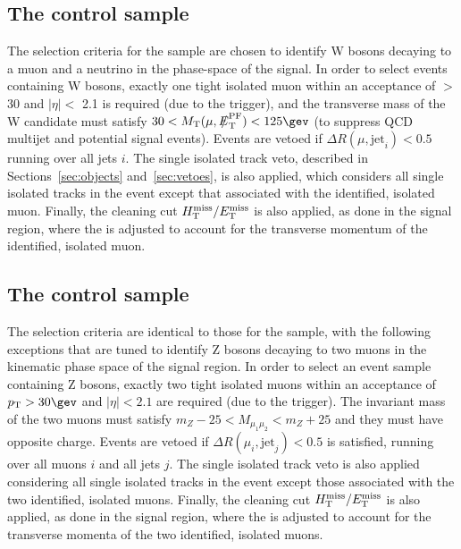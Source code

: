 \subsection{The \texorpdfstring{\mj}{muon plus jets} control sample}
\label{subsec:mucontrolSelection}

The selection criteria for the \mj sample are chosen to identify W
bosons decaying to a muon and a neutrino in the phase-space of the
signal. In order to select events containing W bosons, exactly one
tight isolated muon within an acceptance of \PT $>$ 30 \gev and
$|\eta| <$ 2.1 is required (due to the trigger), and the transverse
mass of the W candidate must satisfy $30 < \mt(\mu,\pfmet) < 125\gev$
(to suppress QCD multijet and potential signal events). Events are
vetoed if $\Delta R(\mu,\textrm{jet}_i) < 0.5$ running over all jets
$i$. The single isolated track veto, described in
Sections~\ref{sec:objects} and~\ref{sec:vetoes}, is also applied,
which considers all single isolated tracks in the event except that
associated with the identified, isolated muon. Finally, the cleaning
cut $\mbox{$H_{\rm T}^{\rm miss}$}/\mbox{$E_\text{T}^{\rm miss}$}$ is also applied, as done in the signal region, where
the \met is adjusted to account for the transverse momentum of the
identified, isolated muon.

\subsection{The \texorpdfstring{\mmj}{di-muon plus jets} control sample}
\label{subsec:mumucontrolSelection}

The selection criteria are identical to those for the \mj sample, with
the following exceptions that are tuned to identify Z bosons decaying
to two muons in the kinematic phase space of the signal region. 
In order to select an event sample containing Z bosons, exactly two
tight isolated muons within an acceptance of $\Pt > 30\gev$ and
$|\eta| < 2.1$ are required (due to the trigger). The invariant mass
of the two muons must satisfy $m_{Z} - 25 < M_{\mu_1\mu_2} < m_{Z} +
25$ and they must have opposite charge. Events are vetoed if $\Delta
R(\mu_{i},\textrm{jet}_j) < 0.5$ is satisfied, running over all muons
$i$ and all jets $j$. The single isolated track veto is also applied
considering all single isolated tracks in the event except those
associated with the two identified, isolated muons. Finally, the
cleaning cut $\mbox{$H_{\rm T}^{\rm miss}$}/\mbox{$E_\text{T}^{\rm miss}$}$ is also applied, as done in the signal
region, where the \met is adjusted to account for the transverse
momenta of the two identified, isolated muons. 

